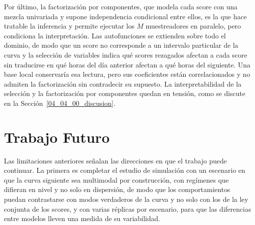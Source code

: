 Por último, la factorización por componentes, que modela cada score con una mezcla univariada y supone independencia condicional entre ellos, es la que hace tratable la inferencia y permite ejecutar los $M$ muestreadores en paralelo, pero condiciona la interpretación. Las autofunciones se extienden sobre todo el dominio, de modo que un score no corresponde a un intervalo particular de la curva y la selección de variables indica qué scores rezagados afectan a cada score sin traducirse en qué horas del día anterior afectan a qué horas del siguiente. Una base local conservaría esa lectura, pero sus coeficientes están correlacionados y no admiten la factorización sin contradecir su supuesto. La interpretabilidad de la selección y la factorización por componentes quedan en tensión, como se discute en la Sección~\ref{04_04_00_discusion}.

\section{Trabajo Futuro}
\label{05_03_00_trabajo_futuro}

Las limitaciones anteriores señalan las direcciones en que el trabajo puede continuar. La primera es completar el estudio de simulación con un escenario en que la curva siguiente sea multimodal por construcción, con regímenes que difieran en nivel y no solo en dispersión, de modo que los comportamientos puedan contrastarse con modos verdaderos de la curva y no solo con los de la ley conjunta de los scores, y con varias réplicas por escenario, para que las diferencias entre modelos lleven una medida de su variabilidad.\\

